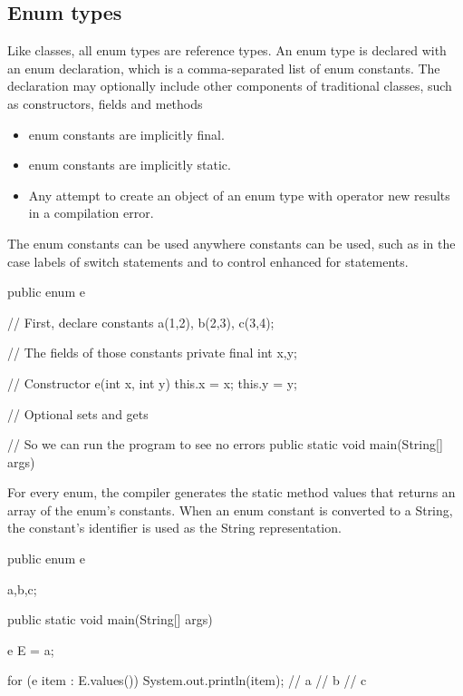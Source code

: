 \documentclass{report}
\begin{document}
    \subsection{Enum types}
    \bigbreak \noindent 
    Like classes, all enum types are reference types. An enum type is declared with an enum declaration, which is a comma-separated list of enum constants.
    \bigbreak \noindent 
    The declaration may optionally include other components of traditional classes, such as constructors, fields and methods
    \bigbreak \noindent 
    \begin{itemize}
        \item enum constants are implicitly final.
        \item enum constants are implicitly static.
        \item Any attempt to create an object of an enum type with operator new results in a compilation error.
    \end{itemize}
    \bigbreak \noindent 
    The enum constants can be used anywhere constants can be used, such as in the case labels of switch statements and to control enhanced for statements.
    \bigbreak \noindent 
    \begin{javacode}
        public enum e {
            // First, declare constants
            a(1,2),
            b(2,3),
            c(3,4);

            // The fields of those constants
            private final int x,y;

            // Constructor
            e(int x, int y) {
                this.x = x;
                this.y = y;
            }

            // Optional sets and gets

            // So we can run the program to see no errors
            public static void main(String[] args)  {

            }
        }
    \end{javacode}
    \bigbreak \noindent 
    For every enum, the compiler generates the static method values that returns an array of the enum’s constants.
    \bigbreak \noindent 
    When an enum constant is converted to a String, the constant’s identifier is used as the String representation.
    \bigbreak \noindent 
    \begin{javacode}
        public enum e{
            a,b,c;

            public static void main(String[] args) {
                e E = a;

                for (e item : E.values()) {
                    System.out.println(item);
                }
                // a
                // b
                // c
            }
        }
    \end{javacode}
\end{document}
